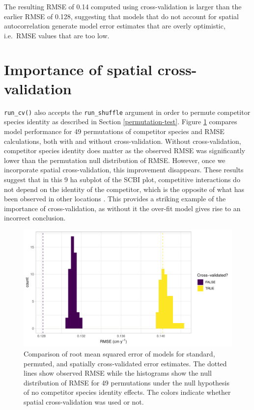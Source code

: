 \documentclass[12pt]{article}
\begin{document}
The resulting RMSE of 0.14 computed using cross-validation is larger
than the earlier RMSE of 0.128, suggesting that models that do not
account for spatial autocorrelation generate model error estimates that
are overly optimistic, i.e.~RMSE values that are too low.

\hypertarget{importance-of-spatial-cross-validation}{%
\section{Importance of spatial
cross-validation}\label{importance-of-spatial-cross-validation}}

\texttt{run\_cv()} also accepts the \texttt{run\_shuffle} argument in
order to permute competitor species identity as described in Section
\ref{permutation-test}. Figure \ref{fig:scbi-simulation} compares model
performance for 49 permutations of competitor species and RMSE
calculations, both with and without cross-validation. Without
cross-validation, competitor species identity does matter as the
observed RMSE was significantly lower than the permutation null
distribution of RMSE. However, once we incorporate spatial
cross-validation, this improvement disappears. These results suggest
that in this 9 ha subplot of the SCBI plot, competitive interactions do
not depend on the identity of the competitor, which is the opposite of
what has been observed in other locations \citep[
\citet{uriarte_spatially_2004}]{allen_permutation_2020}. This provides a
striking example of the importance of cross-validation, as without it
the over-fit model gives rise to an incorrect conclusion.

\begin{figure}

{\centering \includegraphics[width=1\linewidth]{simulation_results/2021-03-03_scbi_49_shuffles} 

}

\caption{Comparison of root mean squared error of models for standard, permuted, and spatially cross-validated error estimates. The dotted lines show observed RMSE while the histograms show the null distribution of RMSE for 49 permutations under the null hypothesis of no competitor species identity effects. The colors indicate whether spatial cross-validation was used or not.}\label{fig:scbi-simulation}
\end{figure}
\end{document}

